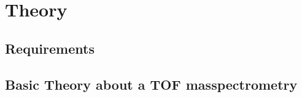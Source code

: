 \section{Theory}

	\subsection{Requirements}
	
	\subsection{Basic Theory about a TOF masspectrometry} %
	
